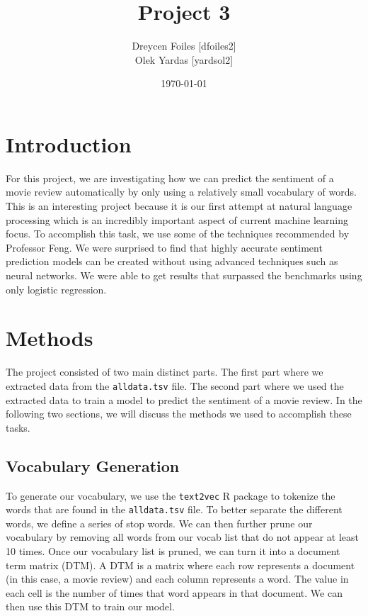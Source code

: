 \documentclass{article}
\title{Project 3}
\author{Dreycen Foiles [dfoiles2] \\ Olek Yardas [yardsol2]}
\date{\today}
\begin{document}
\maketitle

\section{Introduction}

For this project, we are investigating how we can predict the sentiment of a movie review automatically by only using a relatively small vocabulary of words. This is an interesting project because it is our first attempt at natural language processing which is an incredibly important aspect of current machine learning focus. To accomplish this task, we use some of the techniques recommended by Professor Feng. We were surprised to find that highly accurate sentiment prediction models can be created without using advanced techniques such as neural networks. We were able to get results that surpassed the benchmarks using only logistic regression. 

\section{Methods}

The project consisted of two main distinct parts. The first part where we extracted data from the \verb,alldata.tsv, file. The second part where we used the extracted data to train a model to predict the sentiment of a movie review. In the following two sections, we will discuss the methods we used to accomplish these tasks.

\subsection{Vocabulary Generation}

To generate our vocabulary, we use the \verb,text2vec, R package to tokenize the words that are found in the \verb,alldata.tsv, file. To better separate the different words, we define a series of stop words. We can then further prune our vocabulary by removing all words from our vocab list that do not appear at least 10 times. Once our vocabulary list is pruned, we can turn it into a document term matrix (DTM). A DTM is a matrix where each row represents a document (in this case, a movie review) and each column represents a word. The value in each cell is the number of times that word appears in that document. We can then use this DTM to train our model.
\end{document}
